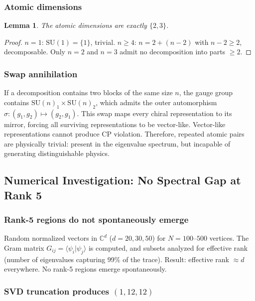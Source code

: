 \documentclass[12pt]{article}
\newtheorem{lemma}[theorem]{Lemma}
\theoremstyle{remark}
\theoremstyle{definition}
\newcommand{\CC}{\mathbb{C}}
\begin{document}
\subsubsection{Atomic dimensions}

\begin{lemma}
The atomic dimensions are exactly $\{2, 3\}$.
\end{lemma}

\begin{proof}
$n = 1$: $\text{SU}(1) = \{1\}$, trivial. $n \geq 4$: $n = 2 + (n-2)$ with $n-2 \geq 2$, decomposable. Only $n = 2$ and $n = 3$ admit no decomposition into parts $\geq 2$.
\end{proof}

\subsubsection{Swap annihilation}

If a decomposition contains two blocks of the same size $n$, the gauge group contains $\text{SU}(n)_1 \times \text{SU}(n)_2$, which admits the outer automorphism $\sigma: (g_1, g_2) \mapsto (g_2, g_1)$. This swap maps every chiral representation to its mirror, forcing all surviving representations to be vector-like. Vector-like representations cannot produce CP violation. Therefore, repeated atomic pairs are physically trivial: present in the eigenvalue spectrum, but incapable of generating distinguishable physics.

\subsection{Numerical Investigation: No Spectral Gap at Rank 5}

\subsubsection{Rank-5 regions do not spontaneously emerge}

Random normalized vectors in $\CC^d$ ($d = 20, 30, 50$) for $N = 100$--$500$ vertices. The Gram matrix $G_{ij} = \langle\psi_i|\psi_j\rangle$ is computed, and subsets analyzed for effective rank (number of eigenvalues capturing 99\% of the trace). Result: effective rank $\approx d$ everywhere. No rank-5 regions emerge spontaneously.

\subsubsection{SVD truncation produces $(1, 12, 12)$}
\end{document}

